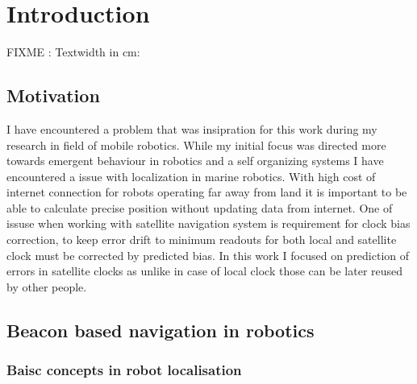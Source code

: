 \chapter{Introduction}
FIXME : Textwidth in cm: \prntlen{\textwidth}

\section{Motivation}
I have encountered a problem that was insipration for this work during my research in field
of mobile robotics. While my initial focus was directed more towards emergent behaviour in 
robotics and a self organizing systems I have encountered a issue with localization in marine 
robotics. With high cost of internet connection for robots operating far away from land it 
is important to be able to calculate precise position without updating data from internet.
One of issuse when working with satellite navigation system is requirement for clock bias
correction, to keep error drift to minimum readouts for both local and satellite clock must
be corrected by predicted bias. In this work I focused on prediction of errors in satellite
clocks as unlike in case of local clock those can be later reused by other people.


\section{Beacon based navigation in robotics}

\subsection{Baisc concepts in robot localisation}

